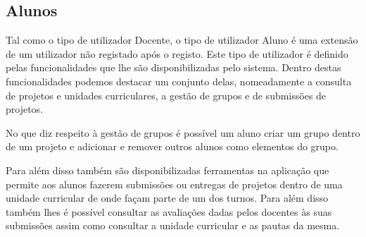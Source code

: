 \subsection{Alunos}

Tal como o tipo de utilizador Docente, o tipo de utilizador Aluno é uma extensão 
de um utilizador não registado após o registo. Este tipo de utilizador é 
definido pelas funcionalidades que lhe são disponibilizadas pelo sistema. Dentro 
destas funcionalidades podemos destacar um conjunto delas, nomeadamente a 
consulta de projetos e unidades curriculares, a gestão de grupos e de submissões de projetos.

No que diz respeito à gestão de grupos é possível um aluno criar um grupo dentro 
de um projeto e adicionar e remover outros alunos como elementos do grupo.

Para além disso também são disponibilizadas ferramentas na aplicação que permite 
aos alunos fazerem submissões ou entregas de projetos dentro de uma unidade 
curricular de onde façam parte de um dos turnos. Para além disso também lhes é 
possível consultar as avaliações dadas pelos docentes às suas submissões assim 
como consultar a unidade curricular e as pautas da mesma.

\newpage
